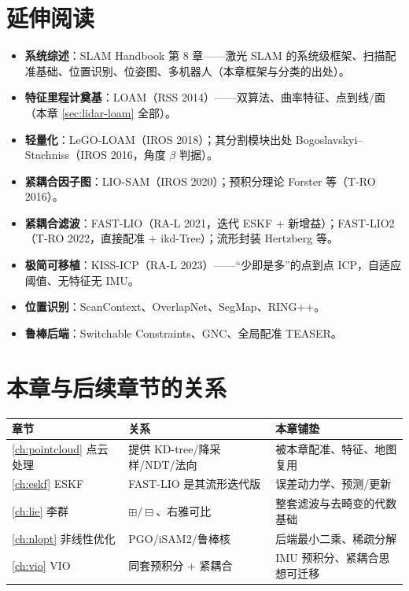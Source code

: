 \section*{延伸阅读}
\begin{itemize}
  \item \textbf{系统综述}：SLAM Handbook\cite{carlone2026handbook} 第 8 章——激光 SLAM 的系统级框架、扫描配准基础、位置识别、位姿图、多机器人（本章框架与分类的出处）。
  \item \textbf{特征里程计奠基}：LOAM\cite{zhang2014loam}（RSS 2014）——双算法、曲率特征、点到线/面（本章 \cref{sec:lidar-loam} 全部）。
  \item \textbf{轻量化}：LeGO-LOAM\cite{shan2018legoloam}（IROS 2018）；其分割模块出处 Bogoslavskyi–Stachniss\cite{bogoslavskyi2016fast}（IROS 2016，角度 $\beta$ 判据）。
  \item \textbf{紧耦合因子图}：LIO-SAM\cite{shan2020liosam}（IROS 2020）；预积分理论 Forster 等\cite{forster2017preintegration}（T-RO 2016）。
  \item \textbf{紧耦合滤波}：FAST-LIO\cite{xu2021fastlio}（RA-L 2021，迭代 ESKF + 新增益）；FAST-LIO2\cite{xu2022fastlio2}（T-RO 2022，直接配准 + ikd-Tree\cite{cai2021ikdtree}）；流形封装 Hertzberg 等\cite{hertzberg2013integrating}。
  \item \textbf{极简可移植}：KISS-ICP\cite{vizzo2023kissicp}（RA-L 2023）——“少即是多”的点到点 ICP，自适应阈值、无特征无 IMU。
  \item \textbf{位置识别}：ScanContext\cite{kim2018scancontext}、OverlapNet\cite{chen2020overlapnet}、SegMap\cite{dube2017segmap}、RING++\cite{lu2023ringpp}。
  \item \textbf{鲁棒后端}：Switchable Constraints\cite{sunderhauf2012switchable}、GNC\cite{yang2020gnc}、全局配准 TEASER\cite{yang2020teaser}。
\end{itemize}

\section*{本章与后续章节的关系}
\begin{table}[H]\centering\small
\begin{tabular}{lll}
\toprule
章节 & 关系 & 本章铺垫 \\
\midrule
\cref{ch:pointcloud} 点云处理 & 提供 KD-tree/降采样/NDT/法向 & 被本章配准、特征、地图复用 \\
\cref{ch:eskf} ESKF & FAST-LIO 是其流形迭代版 & 误差动力学、预测/更新 \\
\cref{ch:lie} 李群 & $\boxplus/\boxminus$、右雅可比 & 整套滤波与去畸变的代数基础 \\
\cref{ch:nlopt} 非线性优化 & PGO/iSAM2/鲁棒核 & 后端最小二乘、稀疏分解 \\
\cref{ch:vio} VIO & 同套预积分 + 紧耦合 & IMU 预积分、紧耦合思想可迁移 \\
\bottomrule
\end{tabular}
\end{table}

